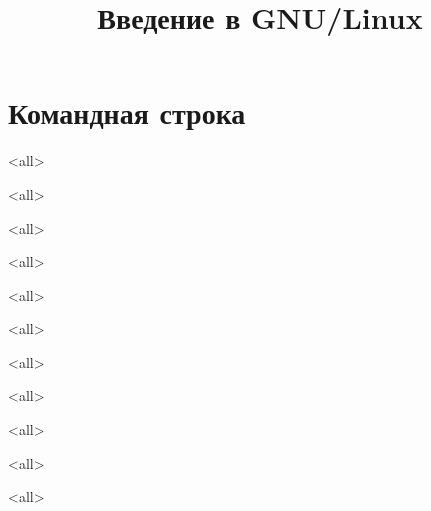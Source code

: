 

\title{Введение в GNU/Linux}





\begin{frame}
	\frametitle{}
	\titlepage
	\vspace{-0.5cm}
	\begin{center}
	\end{center}
\end{frame}
\begin{frame}
	\tableofcontents
\end{frame}

\section{Командная строка}

\mode<all>{}

\mode<all>{}

\mode<all>{}

\mode<all>{}

\mode<all>{}

\mode<all>{}

\mode<all>{}

\mode<all>{}

\mode<all>{}

\mode<all>{}

\mode<all>{}


